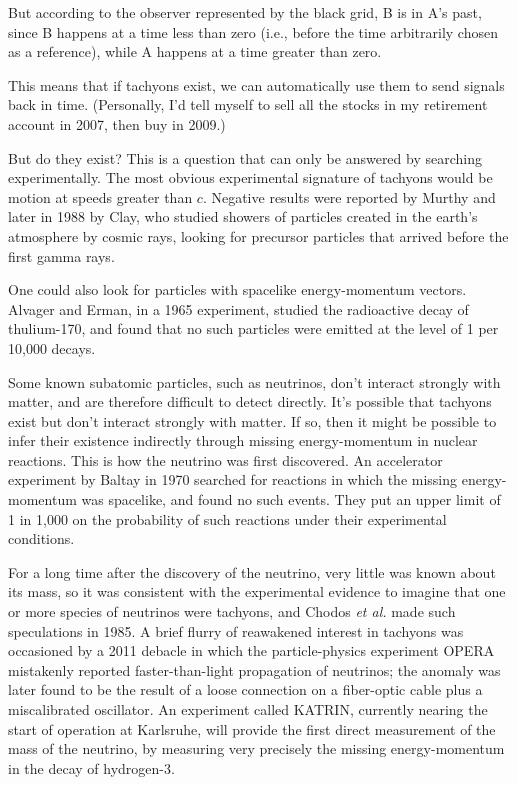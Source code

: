 But according to the observer represented by the black grid, B is in A's past, since B happens at a time less than
zero (i.e., before the time arbitrarily chosen as a reference), while A happens at a time greater than zero.

This means that if tachyons exist, we can automatically use them to send signals back in time. (Personally, I'd
tell myself to sell all the stocks in my retirement account in 2007, then buy in 2009.)

But do they exist? This is a question that can only be answered by searching experimentally.
The most obvious experimental signature of tachyons would be motion at speeds greater than $c$.
Negative results were reported by Murthy and later in 1988 by 
Clay, who studied showers of particles created in the earth's atmosphere by cosmic rays, looking
for precursor particles that arrived before the first gamma rays.

One could also look for
particles with spacelike energy-mom\-ent\-um vectors. Alvager and Erman, in a 1965 experiment, studied the radioactive decay
of thulium-170, and found that no such particles were emitted at the level of 1 per 10,000 decays.

Some known subatomic particles, such as neutrinos, don't interact strongly with matter, and are therefore
difficult to detect directly.
It's possible that tachyons exist but don't interact strongly with matter. If so, then
it might be possible to infer their existence indirectly through missing energy-momentum
in nuclear reactions. This is how the neutrino was first discovered.
An accelerator experiment by Baltay in 1970 searched for reactions in which the missing energy-momentum
was spacelike, and found no such events. They put an upper limit of 1 in 1,000 on the probability of
such reactions under their experimental conditions.

For a long time after the discovery of the neutrino, very little was known about its mass, so
it was consistent with the experimental evidence to imagine that one or more species of neutrinos were tachyons, and
Chodos \emph{et al.} made such speculations in 1985.
A brief flurry of reawakened interest
in tachyons was occasioned by a 2011 debacle in which the particle-physics experiment OPERA
mistakenly reported faster-than-light propagation of neutrinos; the anomaly was later found to
be the result of a loose connection on a fiber-optic cable plus a miscalibrated oscillator.
An experiment called KATRIN, currently nearing the start of operation at Karlsruhe, will
provide the first direct measurement of the mass of the neutrino, by measuring very precisely the
missing energy-momentum in the decay of hydrogen-3.
